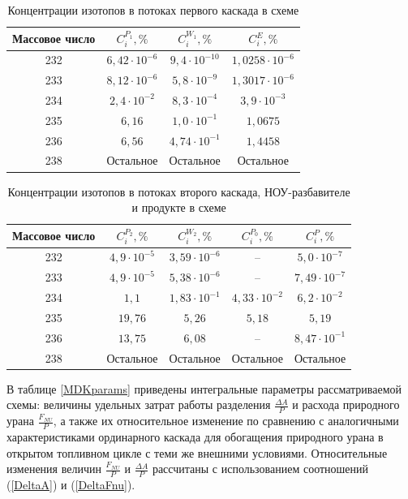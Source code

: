     \begin{table}[ht]
\begin{tabular}{|c|c|c|c|}
    \hline Массовое число & $C_{i}^{P_{1}}, \%$ & $C_{i}^{W_{1}}, \%$ & $C_{i}^{E}, \%$\\
    \hline 232 & $6,42\cdot10^{-6}$ & $9,4\cdot10^{-10}$ & $1,0258\cdot10^{-6}$\\
    233 & $8,12\cdot10^{-6}$ & $5,8\cdot10^{-9}$ & $1,3017\cdot10^{-6}$\\
    234 & $2,4\cdot10^{-2}$ & $8,3\cdot10^{-4}$ & $3,9\cdot10^{-3}$\\
    235 & $6,16$ & $1,0\cdot10^{-1}$ & $1,0675$\\
    236 & $6,56$ & $4,74\cdot10^{-1}$ & $1,4458$\\
    238 & Остальное & Остальное & Остальное\\
    \hline
\end{tabular}
\caption{Концентрации изотопов в потоках первого каскада в схеме}\label{MDKcas1params}
\end{table}

\begin{table}[ht]
    \begin{tabular}{|c|c|c|c|c|}
        \hline Массовое число & $C_{i}^{P_{2}}, \%$ & $C_{i}^{W_{2}}, \%$ & $C_{i}^{P_{0}}, \%$ & $C_{i}^{P}, \%$\\
        \hline 232 & $4,9\cdot10^{-5}$ & $3,59\cdot10^{-6}$ & -- & $5,0\cdot10^{-7}$\\
        233 & $4,9\cdot10^{-5}$ & $5,38\cdot10^{-6}$ & -- & $7,49\cdot10^{-7}$\\
        234 & $1,1$ & $1,83\cdot10^{-1}$ & $4,33\cdot10^{-2}$ & $6,2\cdot10^{-2}$\\
        235 & $19,76$ & $5,26$ & $5,18$  & $5,19$\\
        236 & $13,75$ & $6,08$ & --  & $8,47\cdot10^{-1}$\\
        238 & Остальное & Остальное & Остальное  & Остальное\\
        \hline
\end{tabular}
\caption{Концентрации изотопов в потоках второго каскада, НОУ-разбавителе и продукте в схеме}\label{MDKcas2params}
\end{table}

В таблице \ref{MDKparams} приведены интегральные параметры рассматриваемой схемы: величины удельных затрат работы разделения $\frac{\Delta A}{P}$ и расхода природного урана $\frac{F_{NU}}{P}$, а также их относительное изменение по сравнению с аналогичными характеристиками ординарного каскада для обогащения природного урана в открытом топливном цикле с теми же внешними условиями. Относительные изменения величин $\frac{F_{NU}}{P}$ и $\frac{\Delta A}{P}$ рассчитаны с использованием соотношений (\ref{DeltaA}) и (\ref{DeltaFnu}).


